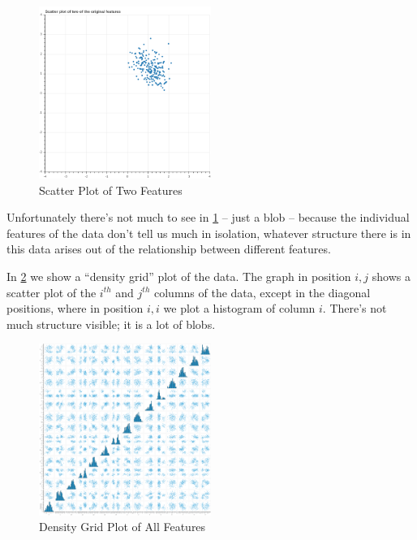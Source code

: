 \documentclass[
]{article}
\begin{document}
\begin{figure}
\hypertarget{fig:features}{%
\centering
\includegraphics[width=0.5\textwidth,height=\textheight]{../img/features.png}
\caption{Scatter Plot of Two Features}\label{fig:features}
}
\end{figure}

Unfortunately there's not much to see in \cref{fig:features} -- just a
blob -- because the individual features of the data don't tell us much
in isolation, whatever structure there is in this data arises out of the
relationship between different features.

In \cref{fig:densitygrid} we show a ``density grid'' plot of the data.
The graph in position \(i,j\) shows a scatter plot of the \(i^{th}\) and
\(j^{th}\) columns of the data, except in the diagonal positions, where
in position \(i,i\) we plot a histogram of column \(i\). There's not
much structure visible; it is a lot of blobs.

\begin{figure}
\hypertarget{fig:densitygrid}{%
\centering
\includegraphics[width=0.5\textwidth,height=\textheight]{../img/density.png}
\caption{Density Grid Plot of All Features}\label{fig:densitygrid}
}
\end{figure}
\end{document}
